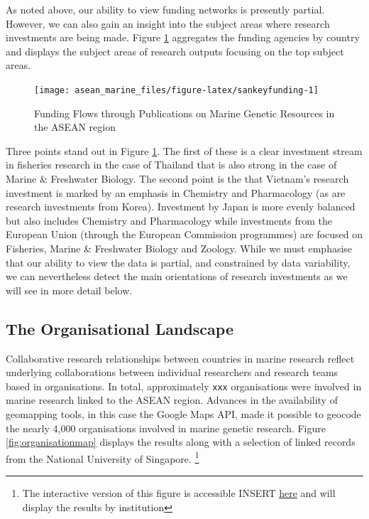 \documentclass[]{book}
\theoremstyle{definition}
\theoremstyle{definition}
\theoremstyle{definition}
\theoremstyle{remark}
\begin{document}
As noted above, our ability to view funding networks is presently
partial. However, we can also gain an insight into the subject areas
where research investments are being made. Figure
\ref{fig:sankeyfunding} aggregates the funding agencies by country and
displays the subject areas of research outputs focusing on the top
subject areas.

\begin{figure}

{\centering \texttt{[image: asean\_marine\_files/figure-latex/sankeyfunding-1]} 

}

\caption{Funding Flows through Publications on Marine Genetic Resources in the ASEAN region}\label{fig:sankeyfunding}
\end{figure}

Three points stand out in Figure \ref{fig:sankeyfunding}. The first of
these is a clear investment stream in fisheries research in the case of
Thailand that is also strong in the case of Marine \& Freshwater
Biology. The second point is the that Vietnam's research investment is
marked by an emphasis in Chemistry and Pharmacology (as are research
investments from Korea). Investment by Japan is more evenly balanced but
also includes Chemistry and Pharmacology while investments from the
European Union (through the European Commission programmes) are focused
on Fisheries, Marine \& Freshwater Biology and Zoology. While we must
emphasise that our ability to view the data is partial, and constrained
by data variability, we can nevertheless detect the main orientations of
research investments as we will see in more detail below.

\hypertarget{the-organisational-landscape}{%
\subsection{The Organisational
Landscape}\label{the-organisational-landscape}}

Collaborative research relationships between countries in marine
research reflect underlying collaborations between individual
researchers and research teams based in organisations. In total,
approximately \texttt{xxx} organisations were involved in marine
research linked to the ASEAN region. Advances in the availability of
geomapping tools, in this case the Google Maps API, made it possible to
geocode the nearly 4,000 organisations involved in marine genetic
research. Figure \ref{fig:organisationmap} displays the results along
with a selection of linked records from the National University of
Singapore. \footnote{The interactive version of this figure is
  accessible INSERT \href{}{here} and will display the results by
  institution}
\end{document}
